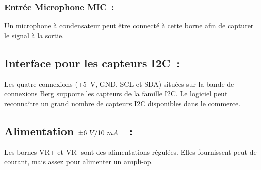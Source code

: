 \documentclass[a4paper,12pt,french]{sphinxmanual}
\begin{document}
\subsubsection{Entrée Microphone MIC :}
\label{\detokenize{1.2:entree-microphone-mic}}
Un microphone à condensateur peut être connecté à cette borne afin
de capturer le signal à la sortie.


\subsection{Interface pour les capteurs I2C :}
\label{\detokenize{1.2:interface-pour-les-capteurs-i2c}}
Les quatre connexions (+5 V, GND, SCL et SDA) situées sur la bande
de connexions Berg supporte les capteurs de la famille I2C. Le logiciel
peut reconnaître un grand nombre de capteurs I2C disponibles dans
le commerce.


\subsection{Alimentation \protect\(\pm6~V/10~mA\protect\)  :}
\label{\detokenize{1.2:alimentation-pm6-v-10-ma}}
Les bornes VR+ et VR- sont des alimentations régulées. Elles fournissent
peut de courant, mais assez pour alimenter un ampli-op.
\end{document}
